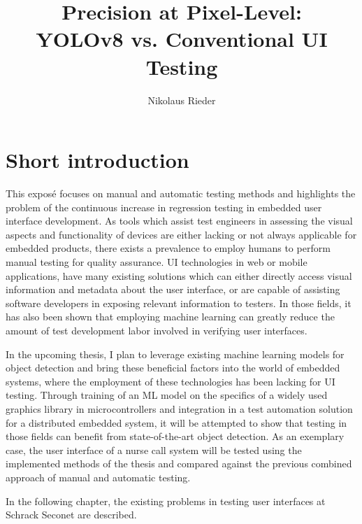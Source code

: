 \documentclass[Proposal,BIC,english,IEEE]{BASE/twbook} %
\title{Precision at Pixel-Level:\\YOLOv8 vs. Conventional UI Testing}
\author{Nikolaus Rieder}
\begin{document}
\maketitle
\chapter{Short introduction}
This exposé focuses on manual and automatic testing methods and highlights the problem of the continuous increase in regression testing in embedded user interface development. As tools which assist test engineers in assessing the visual aspects and functionality of devices are either lacking or not always applicable for embedded products, there exists a prevalence to employ humans to perform manual testing for quality assurance. UI technologies in web or mobile applications, have many existing solutions which can either directly access visual information and metadata about the user interface, or are capable of assisting software developers in exposing relevant information to testers. In those fields, it has also been shown that employing machine learning can greatly reduce the amount of test development labor involved in verifying user interfaces.

In the upcoming thesis, I plan to leverage existing machine learning models for object detection and bring these beneficial factors into the world of embedded systems, where the employment of these technologies has been lacking for UI testing. Through training of an ML model on the specifics of a widely used graphics library in microcontrollers and integration in a test automation solution for a distributed embedded system, it will be attempted to show that testing in those fields can benefit from state-of-the-art object detection. As an exemplary case, the user interface of a nurse call system will be tested using the implemented methods of the thesis and compared against the previous combined approach of manual and automatic testing.

In the following chapter, the existing problems in testing user interfaces at Schrack Seconet are described.

\newpage
\pagestyle{ExperienceFromAuthor}
\end{document}
